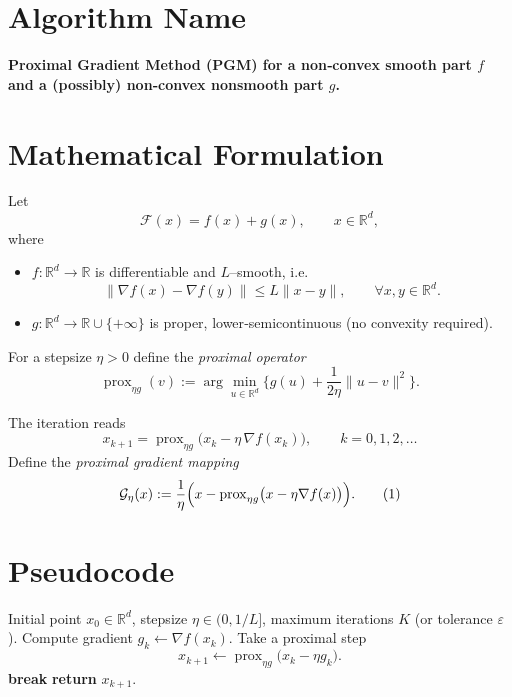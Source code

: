\documentclass{article}
\newcommand{\prox}{\operatorname{prox}}
\newcommand{\grad}{\nabla}
\newcommand{\R}{\mathbb{R}}
\newcommand{\G}{\mathcal{G}}
\newcommand{\F}{\mathcal{F}}
\begin{document}
\section*{Algorithm Name}
\textbf{Proximal Gradient Method (PGM) for a non‑convex smooth part $f$ and a (possibly) non‑convex nonsmooth part $g$.}

\section*{Mathematical Formulation}
Let  
\[
\F(x)=f(x)+g(x),\qquad x\in\R^{d},
\]
where  

\begin{itemize}
  \item $f:\R^{d}\rightarrow\R$ is differentiable and $L$–smooth, i.e.
        \[
        \|\grad f(x)-\grad f(y)\|\le L\|x-y\|,\qquad\forall x,y\in\R^{d}.
        \]
  \item $g:\R^{d}\rightarrow\R\cup\{+\infty\}$ is proper, lower‑semicontinuous (no convexity required).
\end{itemize}

For a stepsize $\eta>0$ define the \emph{proximal operator}
\[
\prox_{\eta g}(v):=\arg\min_{u\in\R^{d}}\Big\{ g(u)+\frac{1}{2\eta}\|u-v\|^{2}\Big\}.
\]

The iteration reads
\begin{equation}
\boxed{
x_{k+1}= \prox_{\eta g}\bigl(x_{k}-\eta\,\grad f(x_{k})\bigr)},\qquad k=0,1,2,\dots
\label{eq:update}
\end{equation}
Define the \emph{proximal gradient mapping}
\[
\G_{\eta}(x):=\frac{1}{\eta}\Bigl(x-\prox_{\eta g}\bigl(x-\eta \grad f(x)\bigr)\Bigr).
\tag{1}
\]

\section*{Pseudocode}
\begin{algorithm}[H]
\caption{Proximal Gradient Method}
\begin{algorithmic}[1]
\Require Initial point $x_{0}\in\R^{d}$, stepsize $\eta\in(0,1/L]$,
          maximum iterations $K$ (or tolerance $\varepsilon$).
    \State Compute gradient $g_{k}\gets \grad f(x_{k})$.
    \State Take a proximal step 
          \[
          x_{k+1}\gets \prox_{\eta g}\bigl(x_{k}-\eta g_{k}\bigr).
          \]
    \If{$\|\G_{\eta}(x_{k})\|\le \varepsilon$}
        \State \textbf{break}
    \EndIf
\EndFor
\State \textbf{return} $x_{k+1}$.
\end{algorithmic}
\end{algorithm}
\end{document}
